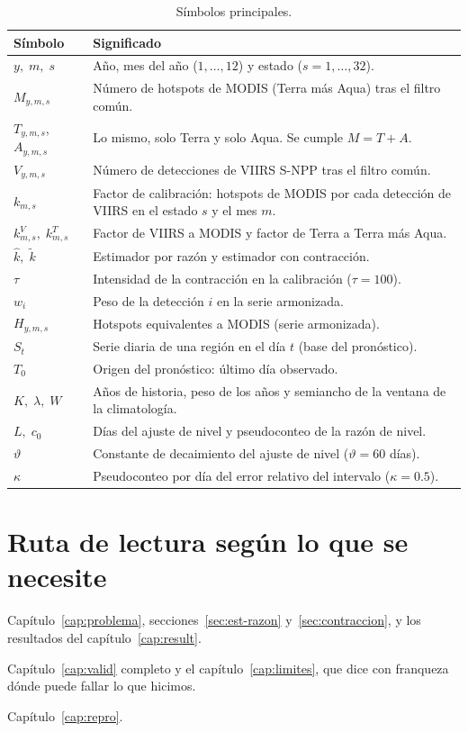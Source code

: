 \begin{table}[H]
\centering
\caption{Símbolos principales.}\label{tab:simbolos}
\small
\begin{tabularx}{\textwidth}{@{}lX@{}}
\toprule
Símbolo & Significado \\
\midrule
$y,\;m,\;s$ & Año, mes del año ($1,\dots,12$) y estado ($s=1,\dots,32$). \\
$M_{y,m,s}$ & Número de hotspots de MODIS (Terra más Aqua) tras el filtro común. \\
$T_{y,m,s}$, $A_{y,m,s}$ & Lo mismo, solo Terra y solo Aqua. Se cumple $M=T+A$. \\
$V_{y,m,s}$ & Número de detecciones de VIIRS S-NPP tras el filtro común. \\
$k_{m,s}$ & Factor de calibración: hotspots de MODIS por cada detección de VIIRS en el estado $s$ y el mes $m$. \\
$k^{V}_{m,s},\;k^{T}_{m,s}$ & Factor de VIIRS a MODIS y factor de Terra a Terra más Aqua. \\
$\widehat{k},\;\widetilde{k}$ & Estimador por razón y estimador con contracción. \\
$\tau$ & Intensidad de la contracción en la calibración ($\tau=100$). \\
$w_i$ & Peso de la detección $i$ en la serie armonizada. \\
$H_{y,m,s}$ & Hotspots equivalentes a MODIS (serie armonizada). \\
$S_t$ & Serie diaria de una región en el día $t$ (base del pronóstico). \\
$T_0$ & Origen del pronóstico: último día observado. \\
$K,\;\lambda,\;W$ & Años de historia, peso de los años y semiancho de la ventana de la climatología. \\
$L,\;c_0$ & Días del ajuste de nivel y pseudoconteo de la razón de nivel. \\
$\vartheta$ & Constante de decaimiento del ajuste de nivel ($\vartheta=60$ días). \\
$\kappa$ & Pseudoconteo por día del error relativo del intervalo ($\kappa=0.5$). \\
\bottomrule
\end{tabularx}
\end{table}

\section{Ruta de lectura según lo que se necesite}

\begin{description}[leftmargin=1.2em,style=nextline]
  \item[Para exponer el proyecto en cinco minutos.] Capítulo~\ref{cap:problema}, secciones~\ref{sec:est-razon} y~\ref{sec:contraccion}, y los resultados del capítulo~\ref{cap:result}.
  \item[Para defender el método ante preguntas.] Capítulo~\ref{cap:valid} completo y el capítulo~\ref{cap:limites}, que dice con franqueza dónde puede fallar lo que hicimos.
  \item[Para reproducir o modificar el código.] Capítulo~\ref{cap:repro}.
\end{description}
